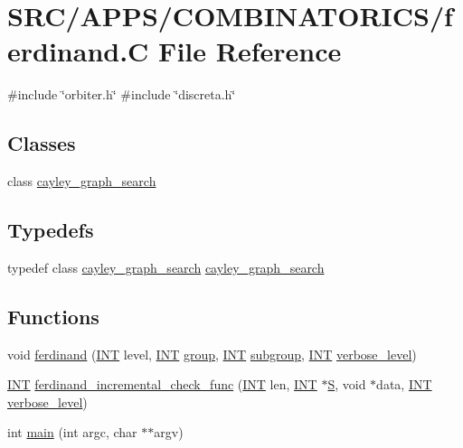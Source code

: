 \hypertarget{ferdinand_8_c}{}\section{S\+R\+C/\+A\+P\+P\+S/\+C\+O\+M\+B\+I\+N\+A\+T\+O\+R\+I\+C\+S/ferdinand.C File Reference}
\label{ferdinand_8_c}
{\ttfamily \#include \char`\"{}orbiter.\+h\char`\"{}}\newline
{\ttfamily \#include \char`\"{}discreta.\+h\char`\"{}}\newline
\subsection*{Classes}
\begin{DoxyCompactItemize}
\item 
class \mbox{\hyperlink{classcayley__graph__search}{cayley\+\_\+graph\+\_\+search}}
\end{DoxyCompactItemize}
\subsection*{Typedefs}
\begin{DoxyCompactItemize}
\item 
typedef class \mbox{\hyperlink{classcayley__graph__search}{cayley\+\_\+graph\+\_\+search}} \mbox{\hyperlink{ferdinand_8_c_a7120aac32412ddcafb3d8444f0d038a5}{cayley\+\_\+graph\+\_\+search}}
\end{DoxyCompactItemize}
\subsection*{Functions}
\begin{DoxyCompactItemize}
\item 
void \mbox{\hyperlink{ferdinand_8_c_a39bebb7bf2c2202d76f42c63c46512ed}{ferdinand}} (\mbox{\hyperlink{galois_8h_a09fddde158a3a20bd2dcadb609de11dc}{I\+NT}} level, \mbox{\hyperlink{galois_8h_a09fddde158a3a20bd2dcadb609de11dc}{I\+NT}} \mbox{\hyperlink{classgroup}{group}}, \mbox{\hyperlink{galois_8h_a09fddde158a3a20bd2dcadb609de11dc}{I\+NT}} \mbox{\hyperlink{classsubgroup}{subgroup}}, \mbox{\hyperlink{galois_8h_a09fddde158a3a20bd2dcadb609de11dc}{I\+NT}} \mbox{\hyperlink{simeon_8_c_a818073fbcc2f439e7c56952f67386122}{verbose\+\_\+level}})
\item 
\mbox{\hyperlink{galois_8h_a09fddde158a3a20bd2dcadb609de11dc}{I\+NT}} \mbox{\hyperlink{ferdinand_8_c_aa2b6e474e95c34c9f692acf51758dbb3}{ferdinand\+\_\+incremental\+\_\+check\+\_\+func}} (\mbox{\hyperlink{galois_8h_a09fddde158a3a20bd2dcadb609de11dc}{I\+NT}} len, \mbox{\hyperlink{galois_8h_a09fddde158a3a20bd2dcadb609de11dc}{I\+NT}} $\ast$\mbox{\hyperlink{simeon_8_c_adab47f8243f1b5a2c31df2535d6b37d0}{S}}, void $\ast$data, \mbox{\hyperlink{galois_8h_a09fddde158a3a20bd2dcadb609de11dc}{I\+NT}} \mbox{\hyperlink{simeon_8_c_a818073fbcc2f439e7c56952f67386122}{verbose\+\_\+level}})
\item 
int \mbox{\hyperlink{ferdinand_8_c_a3c04138a5bfe5d72780bb7e82a18e627}{main}} (int argc, char $\ast$$\ast$argv)
\end{DoxyCompactItemize}


